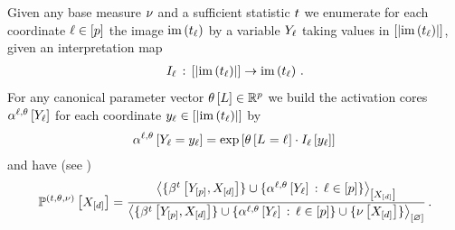 \begin{theorem}
    \label{the:expFamilyTensorRep}
    Given any base measure $\nu$ and a sufficient statistic $t$ we enumerate for each coordinate $\ell\in[p]$ the image $\mathrm{im}\left(t_{\ell}\right)$ by a variable $Y_{\ell}$ taking values in $[\left|\mathrm{im}\left(t_{\ell}\right)\right|]$, given an interpretation map
    \begin{align*}
        I_{\ell} \,:\,
        [\left|\mathrm{im}\left(t_{\ell}\right)\right|] \rightarrow \mathrm{im}\left(t_{\ell}\right) \, .
    \end{align*}
    For any canonical parameter vector $\theta\left[L\right]\in\mathbb{R}^{p}$ we build the activation cores $\alpha^{\ell,\theta}\left[Y_{\ell}\right]$ for each coordinate $y_{\ell}\in[\left|\mathrm{im}\left(t_{\ell}\right)\right|]$ by
    \begin{align*}
        \alpha^{\ell,\theta}\left[Y_{\ell}=y_{\ell}\right]
        = \mathrm{exp}\left[\theta\left[L_{}=\ell_{}\right] \cdot I_{\ell}\left[y_{\ell}\right] \right] \,
    \end{align*}
    and have (see )
    \begin{align*}
        \mathbb{P}^{(t,\theta,\nu)}\left[X_{[d]}\right]
        = \frac{
            \left\langle \{\beta^{t}\left[Y_{[p]},X_{[d]}\right]\}\cup\{\alpha^{\ell,\theta}\left[Y_{\ell}\right] \,:\, \ell\in[p]\}\right\rangle_{\left[ X_{[d]} \right]}
        }{
            \left\langle \{\beta^{t}\left[Y_{[p]},X_{[d]}\right]\}\cup\{\alpha^{\ell,\theta}\left[Y_{\ell}\right] \,:\, \ell\in[p]\}\cup\{\nu\left[X_{[d]}\right]\}\right\rangle_{\left[ \varnothing \right]}
        } \, .
    \end{align*}
\end{theorem}
